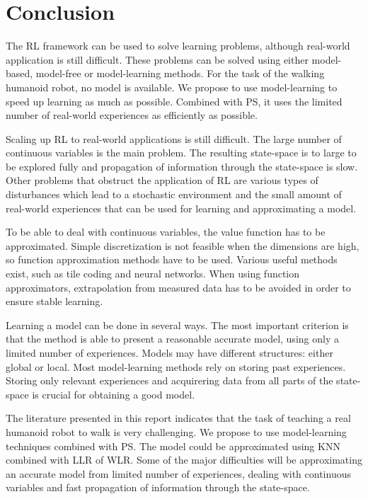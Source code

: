 \documentclass[a4paper,11pt]{mscLiterature}
\begin{document}
\chapter{Conclusion}\label{chap:conclusion}

The RL framework can be used to solve learning problems, although real-world application is still difficult. These problems can be solved using either model-based, model-free or model-learning methods. For the task of the walking humanoid robot, no model is available. We propose to use model-learning to speed up learning as much as possible. Combined with PS, it uses the limited number of real-world experiences as efficiently as possible.

Scaling up RL to real-world applications is still difficult. The large number of continuous variables is the main problem. The resulting state-space is to large to be explored fully and propagation of information through the state-space is slow. Other problems that obstruct the application of RL are various types of disturbances which lead to a stochastic environment and the small amount of real-world experiences that can be used for learning and approximating a model.

To be able to deal with continuous variables, the value function has to be approximated. Simple discretization is not feasible when the dimensions are high, so function approximation methods have to be used. Various useful methods exist, such as tile coding and neural networks. When using function approximators, extrapolation from measured data has to be avoided in order to ensure stable learning.

Learning a model can be done in several ways. The most important criterion is that the method is able to present a reasonable accurate model, using only a limited number of experiences. Models may have different structures: either global or local. Most model-learning methods rely on storing past experiences. Storing only relevant experiences and acquirering data from all parts of the state-space is crucial for obtaining a good model.

The literature presented in this report indicates that the task of teaching a real humanoid robot to walk is very challenging. We propose to use model-learning techniques combined with PS. The model could be approximated using KNN combined with LLR of WLR. Some of the major difficulties will be approximating an accurate model from limited number of experiences, dealing with continuous variables and fast propagation of information through the state-space. 




    


\appendix
 
\end{document}

